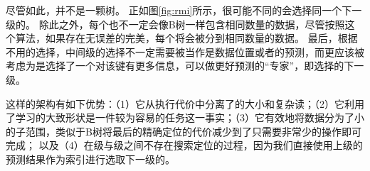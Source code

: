 
尽管如此，{\rmi}并不是一颗树。
正如图\ref{fig:rmi}所示，很可能不同的{\model}会选择同一个下一级的{\model}。
除此之外，每个{\model}也不一定会像B树一样包含相同数量的数据，尽管按照这个算法，如果存在无误差的完美{\model}，每个{\model}将会被分到相同数量的数据。
最后，根据不用的{\model}选择，中间级的选择不一定需要被当作是数据位置或者{\cdf}的预测，而更应该被考虑为是选择了一个对该键有更多信息，可以做更好预测的“专家”，即选择的下一级{\model}。


这样的架构有如下优势：（1）它从执行代价中分离了{\model}的大小和复杂读；（2）它利用了学习{\cdf}的大致形状是一件较为容易的任务这一事实；（3）它有效地将数据分为了小的子范围，类似于B树将最后的精确定位的代价减少到了只需要非常少的操作即可完成；
以及（4）在级与级之间不存在搜索定位的过程，因为我们直接使用上级{\model}的预测结果作为索引进行选取下一级的{\model}。

